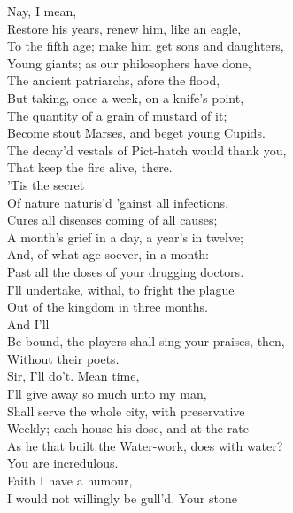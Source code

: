 \documentclass{memoir}
\begin{document}
\begin{drama*}
\mammonspeaks {} Nay, I mean,\\
 Restore his years, renew him, like an eagle,\\
 To the fifth age; make him get sons and daughters,\\
 Young giants; as our philosophers have done,\\
 The ancient patriarchs, afore the flood,\\
 But taking, once a week, on a knife's point,\\
 The quantity of a grain of mustard of it;\\
 Become stout Marses, and beget young Cupids.\\
\surlyspeaks  The decay'd vestals of Pict-hatch would thank you,\\
 That keep the fire alive, there.\\
\mammonspeaks {} 'Tis the secret\\
 Of nature naturis'd 'gainst all infections,\\
 Cures all diseases coming of all causes;\\
 A month's grief in a day, a year's in twelve;\\
 And, of what age soever, in a month:\\
 Past all the doses of your drugging doctors.\\
 I'll undertake, withal, to fright the plague\\
 Out of the kingdom in three months.\\
\surlyspeaks {} And I'll\\
 Be bound, the players shall sing your praises, then,\\
 Without their poets.\\
\mammonspeaks {} Sir, I'll do't. Mean time,\\
 I'll give away so much unto my man,\\
 Shall serve the whole city, with preservative\\
 Weekly; each house his dose, and at the rate--\\
\surlyspeaks  As he that built the Water-work, does with water?\\
\mammonspeaks  You are incredulous.\\
\surlyspeaks {} Faith I have a humour,\\
 I would not willingly be gull'd. Your stone\\

\end{drama*}
\end{document}
